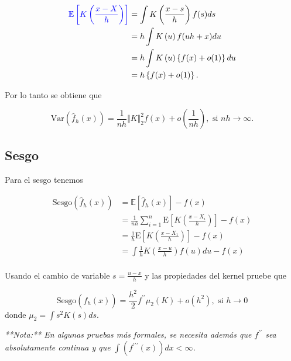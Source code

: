 \documentclass[
  12pt,
]{book}
\theoremstyle{definition}
\theoremstyle{definition}
\theoremstyle{definition}
\theoremstyle{remark}
\let\BeginKnitrBlock\begin \let\EndKnitrBlock\end
\begin{document}
\begin{align*}
\textcolor{blue}{\mathbb{E}\left[K\left(\frac{x-X}{h}\right)\right]}
& =\int K\left(\frac{x-s}{h}\right)f(s)ds            \\
& = h\int K\left(u\right)f(uh+x)du                    \\
& =h\int K\left(u\right)\left\{ f(x)+o(1)\right\} du \\
& =h\left\{f(x)+o(1)\right\} .
\end{align*}

Por lo tanto se obtiene que

\begin{equation*}
\mathrm{Var}\left(\hat{f}_{h}(x)\right) = \frac{1}{nh} \Vert K\Vert_{2}^{2}f(x) + o\left(\frac{1}{nh}\right), \text{ si } nh\to \infty.
\end{equation*}

\hypertarget{sesgo-1}{%
\subsection{Sesgo}\label{sesgo-1}}

Para el sesgo tenemos

\begin{align*}
\mathrm{Sesgo}\left(\hat{f}_{h}(x)\right)
& = \mathbb{E}\left[\hat{f}_{h}(x)\right]-f(x)                                                  \\
& = \frac{1}{nh} \sum_{i=1}^{n} \mathrm{E}\left[K\left( \frac{x-X_{i}}{h} \right)\right] - f(x) \\
& = \frac{1}{h}\mathrm{E}\left[K\left( \frac{x-X_{1}}{h} \right)\right] - f(x)                  \\
& = \int \frac{1}{h} K\left( \frac{x-u}{h}\right)f(u)du -f(x)                                   \\
\end{align*}

\BeginKnitrBlock{exercise}
\protect\hypertarget{exr:unnamed-chunk-23}{}{\label{exr:unnamed-chunk-23} }Usando el cambio de variable \(s=\frac{u-x}{h}\) y las propiedades del kernel pruebe que

\begin{equation*}
\mathrm{Sesgo}\left(\hat{f}_{h}(x)\right) = \frac{h^{2}}{2} f^{\prime\prime} \mu_{2}(K) + o(h^{2}), \text{ si } h\to 0
\end{equation*}
donde \(\mu_{2}=\int s^{2}K(s)ds\).

\emph{**Nota:** En algunas pruebas más formales, se necesita
además que  $f^{\prime\prime}$ sea absolutamente continua y que
$\int(f^{\prime\prime\prime}(x))dx<\infty$.}
\EndKnitrBlock{exercise}
\end{document}
